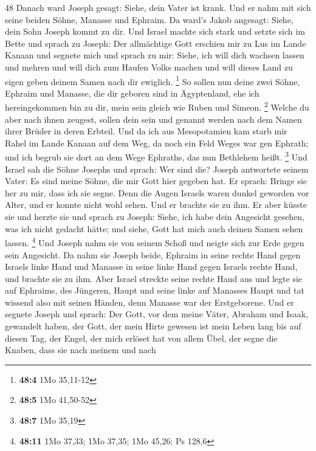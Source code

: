 48  Danach ward Joseph gesagt: Siehe, dein Vater ist
krank. Und er nahm mit sich seine beiden Söhne, Manasse und Ephraim.
 Da ward's Jakob angesagt: Siehe, dein Sohn Joseph kommt
zu dir. Und Israel machte sich stark und setzte sich im Bette
 und sprach zu Joseph: Der allmächtige Gott erschien mir
zu Lus im Lande Kanaan und segnete mich  und sprach zu
mir: Siehe, ich will dich wachsen lassen und mehren und will dich zum
Haufen Volks machen und will dieses Land zu eigen geben deinem Samen
nach dir ewiglich. \footnote{\textbf{48:4} 1Mo 35,11-12} 
So sollen nun deine zwei Söhne, Ephraim und Manasse, die dir geboren
sind in Ägyptenland, ehe ich hereingekommen bin zu dir, mein sein gleich
wie Ruben und Simeon. \footnote{\textbf{48:5} 1Mo 41,50-52}
 Welche du aber nach ihnen zeugest, sollen dein sein und
genannt werden nach dem Namen ihrer Brüder in deren Erbteil.
 Und da ich aus Mesopotamien kam starb mir Rahel im Lande
Kanaan auf dem Weg, da noch ein Feld Weges war gen Ephrath; und ich
begrub sie dort an dem Wege Ephraths, das nun Bethlehem heißt.
\footnote{\textbf{48:7} 1Mo 35,19}  Und Israel sah die
Söhne Josephs und sprach: Wer sind die?  Joseph antwortete
seinem Vater: Es sind meine Söhne, die mir Gott hier gegeben hat. Er
sprach: Bringe sie her zu mir, dass ich sie segne.  Denn
die Augen Israels waren dunkel geworden vor Alter, und er konnte nicht
wohl sehen. Und er brachte sie zu ihm. Er aber küsste sie und herzte sie
 und sprach zu Joseph: Siehe, ich habe dein Angesicht
gesehen, was ich nicht gedacht hätte; und siehe, Gott hat mich auch
deinen Samen sehen lassen. \footnote{\textbf{48:11} 1Mo 37,33; 1Mo
  37,35; 1Mo 45,26; Ps 128,6}  Und Joseph nahm sie von
seinem Schoß und neigte sich zur Erde gegen sein Angesicht.
 Da nahm sie Joseph beide, Ephraim in seine rechte Hand
gegen Israels linke Hand und Manasse in seine linke Hand gegen Israels
rechte Hand, und brachte sie zu ihm.  Aber Israel
streckte seine rechte Hand aus und legte sie auf Ephraims, des Jüngeren,
Haupt und seine linke auf Manasses Haupt und tat wissend also mit seinen
Händen, denn Manasse war der Erstgeborene.  Und er
segnete Joseph und sprach: Der Gott, vor dem meine Väter, Abraham und
Isaak, gewandelt haben, der Gott, der mein Hirte gewesen ist mein Leben
lang bis auf diesen Tag,  der Engel, der mich erlöset hat
von allem Übel, der segne die Knaben, dass sie nach meinem und nach
